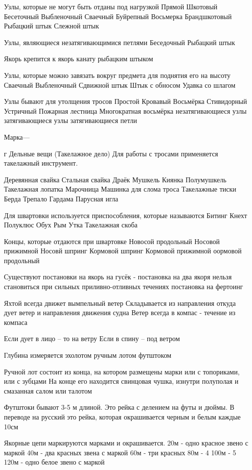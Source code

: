 \documentclass{article}        %
\begin{document}
\begin{description}
Узлы, которые не могут быть отданы под нагрузкой
	Прямой
	Шкотовый
	Бесеточный
	Выбленочный
	Сваечный
	Буйрепный
	Восьмерка
	Брандшкотовый
	Рыбацкий штык
	Слежной штык

Узлы, являющиеся незатягивающимися петлями
	Беседочный
	Рыбацкий штык

Якорь крепится к якорь канату рыбацким штыком

Узлы, которые можно завязать вокруг предмета для поднятия его на высоту
	Сваечный
	Выбленочный
	Сдвижной штык
	Штык с обносом
	Удавка со шлагом

Узлы бывают
	для утолщения тросов
		Простой
		Кровавый
		Восьмёрка
		Стивидорный
		Устричный
		Пожарная лестница
		Многократная восьмёрка
	незатягивающиеся узлы
	затягивающиеся узлы
	затягивающиеся петли
	
Марка---

г
Дельные вещи (Такелажное дело)
Для работы с тросами применяется такелажный инструмент. 


	Деревянная свайка
	Стальная свайка
	Драёк
	Мушкель
	Киянка
	Полумушкель
	Такелажная лопатка
	Марочница
	Машинка для слома троса
	Такелажные тиски
	Берда
	Трепало
	Гардама
	Парусная игла

Для швартовки используется приспособления, которые называются
	Битинг
	Кнехт
	Полуклюс
	Обух
	Рым
	Утка
	Такелажная скоба

Концы, которые отдаются при швартовке
	Новосой продольный
	Носовой прижимной
	Носовй шпринг
	Кормовой шпринг
	Кормовой прижимной
	оормовой продольный

Существуют постановки на якорь
	на гусёк - постановка на два якоря
		нельзя становиться при сильных приливно-отливных течениях
	постановка на фертоинг


Яхтой всегда движет вымпельный ветер
Складывается из направления откуда дует ветер и направления движения судна
Ветер всегда в компас - течение из компаса

Если дует в лицо -- то на ветру
Если в спину -- под ветром

Глубина измеряется
	эхолотом
	ручным лотом
	футштоком

Ручной лот состоит из конца, на котором размещены марки или с топориками, или с зубцами
На конце его находится свинцовая чушка, изнутри полуполая и смазанная салом или талотом

Футштоки бывают 3-5 м длиной. Это рейка с делением на футы и дюймы. В переводе на русский это рейка, которая окрашивается черным и белым каждые 10см

Якорные цепи маркируются марками и окрашивается.
20м - одно красное звено с маркой
40м - два красных звена с маркой
60м - три красных
80м - 4
100м - 5
120м - одно белое звено с маркой






\end{description}
\end{document}
